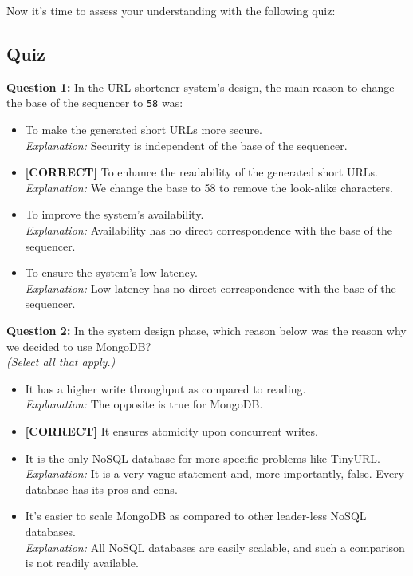 Now it's time to assess your understanding with the following quiz:

\subsection*{Quiz}
\vspace{0.3cm}
\noindent
\textbf{Question 1:} In the URL shortener system's design, the main reason to change the base of the sequencer to \texttt{58} was:
\\[0.2cm]
\begin{itemize}
 \item To make the generated short URLs more secure.
\\[0.1cm]
\textit{Explanation:} 
Security is independent of the base of the sequencer.
 \item \textbf{[CORRECT]} To enhance the readability of the generated short URLs.
\\[0.1cm]
\textit{Explanation:} 
We change the base to 58 to remove the look-alike characters.
 \item To improve the system's availability.
\\[0.1cm]
\textit{Explanation:} 
Availability has no direct correspondence with the base of the sequencer.
 \item To ensure the system's low latency.
\\[0.1cm]
\textit{Explanation:} 
Low-latency has no direct correspondence with the base of the sequencer.
\end{itemize}
\vspace{0.3cm}
\noindent
\textbf{Question 2:} In the system design phase, which reason below was the reason why we decided to use MongoDB?
\\
\textit{(Select all that apply.)}
\\[0.2cm]
\begin{itemize}
 \item It has a higher write throughput as compared to reading.
\\[0.1cm]
\textit{Explanation:} 
The opposite is true for MongoDB.
 \item \textbf{[CORRECT]} It ensures atomicity upon concurrent writes.
 \item It is the only NoSQL database for more specific problems like TinyURL.
\\[0.1cm]
\textit{Explanation:} 
It is a very vague statement and, more importantly, false. Every database has its pros and cons.
 \item It's easier to scale MongoDB as compared to other leader-less NoSQL databases.
\\[0.1cm]
\textit{Explanation:} 
All NoSQL databases are easily scalable, and such a comparison is not readily available.
\end{itemize}
